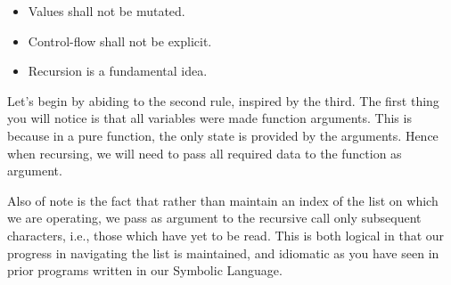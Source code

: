 \begin{itemize}
  \item Values shall not be mutated.
  \item Control-flow shall not be explicit.
  \item Recursion is a fundamental idea.
\end{itemize}

Let's begin by abiding to the second rule, inspired by the third. The first thing 
you will notice is that all variables were made function arguments. This is because 
in a pure function, the only state is provided by the arguments. Hence when 
recursing, we will need to pass all required data to the function as argument.

Also of note is the fact that rather than maintain an index of the list on which we 
are operating, we pass as argument to the recursive call only subsequent characters, 
i.e., those which have yet to be read. This is both logical in that our progress in 
navigating the list is maintained, and idiomatic as you have seen in prior programs 
written in our Symbolic Language.

